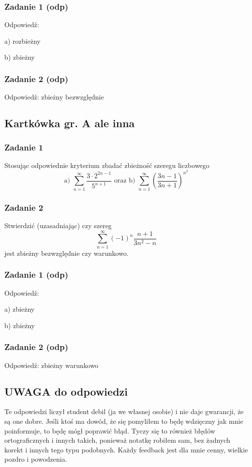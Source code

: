 \documentclass[11pt]{article}
\begin{document}
\subsubsection{Zadanie 1 (odp)}
Odpowiedź: 
\begin{list}{}{}
    \item[a) ] rozbieżny
    \item[b) ] zbieżny
\end{list}
\subsubsection{Zadanie 2 (odp)}
Odpowiedź: zbieżny bezwzględnie

\subsection{Kartkówka gr. A ale inna}
\subsubsection{Zadanie 1}
Stosując odpowiednie kryterium zbadać zbieżność szeregu liczbowego
\[
    \text{a) } \sum_{n = 1}^{\infty}\frac{3 \cdot 2^{2n - 1}}{5^{n + 1}} \text{ oraz }
    \text{b) }\sum_{n = 1}^{\infty}(\frac{3n - 1}{3n + 1})^{n^2}
\]

\subsubsection{Zadanie 2}
Stwierdzić (uzasadniając) czy szereg
\[
    \sum_{n = 1}^{\infty} (-1)^{n} \frac{n + 1}{3n^2 - n}
\]
jest zbieżny bezwzględnie czy warunkowo.
\subsubsection{Zadanie 1 (odp)}
Odpowiedź: 
\begin{list}{}{}
    \item[a) ] zbieżny
    \item[b) ] zbieżny
\end{list}
\subsubsection{Zadanie 2 (odp)}
Odpowiedź: zbieżny warunkowo
\subsection{UWAGA do odpowiedzi}
Te odpowiedzi liczył student debil (ja we własnej osobie) i nie daje gwarancji, że są one dobre.
Jeśli ktoś ma dowód, że się pomyliłem to będę wdzięczny jak mnie poinformuje, to będę mógł poprawić błąd.
Tyczy się to również błędów ortograficznych i innych takich, ponieważ notatkę robiłem sam, bez żadnych korekt
i innych tego typu podobnych. Każdy feedback jest dla mnie cenny, wielkie pozdro i powodzenia.
\end{document}
